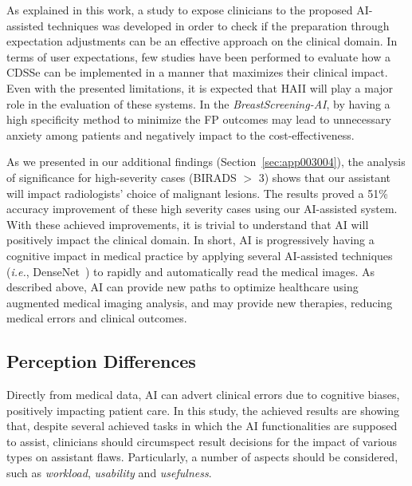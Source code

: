 As explained in this work, a study to expose clinicians to the proposed \ac{AI}-assisted techniques was developed in order to check if the preparation through expectation adjustments can be an effective approach on the clinical domain.
In terms of user expectations, few studies have been performed to evaluate how a \ac{CDSSe} can be implemented in a manner that maximizes their clinical impact.
Even with the presented limitations, it is expected that \ac{HAII} will play a major role in the evaluation of these systems.
In the {\it BreastScreening-AI}, by having a high specificity method to minimize the \ac{FP} outcomes may lead to unnecessary anxiety among patients and negatively impact to the cost-effectiveness.

As we presented in our additional findings (Section~\ref{sec:app003004}), the analysis of significance for high-severity cases (BIRADS $>$ 3) shows that our assistant will impact radiologists' choice of malignant lesions.
The results proved a 51\% accuracy improvement of these high severity cases using our \ac{AI}-assisted system.
With these achieved improvements, it is trivial to understand that \ac{AI} will positively impact the clinical domain.
In short, \ac{AI} is progressively having a cognitive impact in medical practice by applying several AI-assisted techniques ({\it i.e.}, DenseNet~\cite{GOTTAPU2018179}) to rapidly and automatically read the medical images.
As described above, \ac{AI} can provide new paths to optimize healthcare using augmented medical imaging analysis, and may provide new therapies, reducing medical errors and clinical outcomes.

\subsection{Perception Differences}
\label{sec:app003005002}

Directly from medical data, \ac{AI} can advert clinical errors due to cognitive biases, positively impacting patient care.
In this study, the achieved results are showing that, despite several achieved tasks in which the \ac{AI} functionalities are supposed to assist, clinicians should circumspect result decisions for the impact of various types on assistant flaws.
Particularly, a number of aspects should be considered, such as {\it workload}, {\it usability} and {\it usefulness}.

